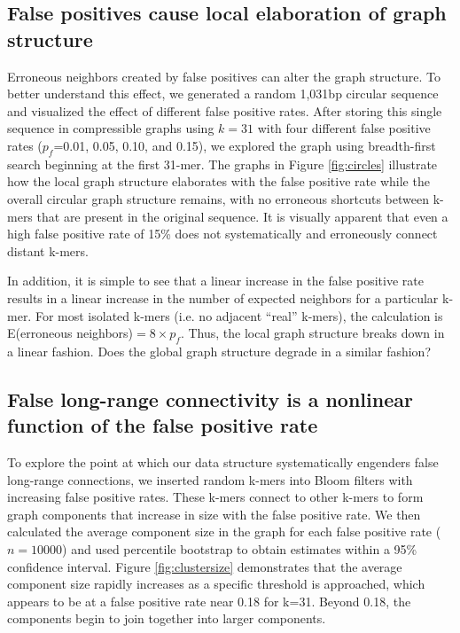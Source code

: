 \documentclass{pnastwo}
\begin{document}
\begin{article}
\subsection{False positives cause local elaboration of graph structure}

Erroneous neighbors created by false positives can alter the graph
structure.  To better understand this effect, we generated a random
1,031bp circular sequence and visualized the effect of different false
positive rates.  After storing this single sequence in compressible
graphs using $k=31$ with four different false positive rates
($p_f$=0.01, 0.05, 0.10, and 0.15), we explored the graph using
breadth-first search beginning at the first 31-mer.  The graphs in
Figure \ref{fig:circles} illustrate how the local graph structure
elaborates with the false positive rate while the overall circular
graph structure remains, with no erroneous shortcuts between k-mers
that are present in the original sequence.  It is visually apparent
that even a high false positive rate of 15\% does not systematically
and erroneously connect distant k-mers.

In addition, it is simple to see that a linear increase in the false
positive rate results in a linear increase in the number of expected
neighbors for a particular k-mer. For most isolated k-mers (i.e. no
adjacent ``real'' k-mers), the calculation is E(erroneous neighbors)$
= 8 \times p_f$. Thus, the local graph structure breaks down in a
linear fashion.  Does the global graph structure degrade in a similar
fashion?

\subsection{False long-range connectivity is a nonlinear function of the false positive rate}

To explore the point at which our data structure systematically
engenders false long-range connections, we inserted random k-mers into
Bloom filters with increasing false positive rates.  These k-mers
connect to other k-mers to form graph components that increase in size
with the false positive rate.  We then calculated the average
component size in the graph for each false positive rate ($n=10000$)
and used percentile bootstrap to obtain estimates within a 95\%
confidence interval. Figure \ref{fig:clustersize} demonstrates that
the average component size rapidly increases as a specific threshold
is approached, which appears to be at a false positive rate near 0.18
for k=31. Beyond 0.18, the components begin to join together into
larger components.


\end{article}
\end{document}
